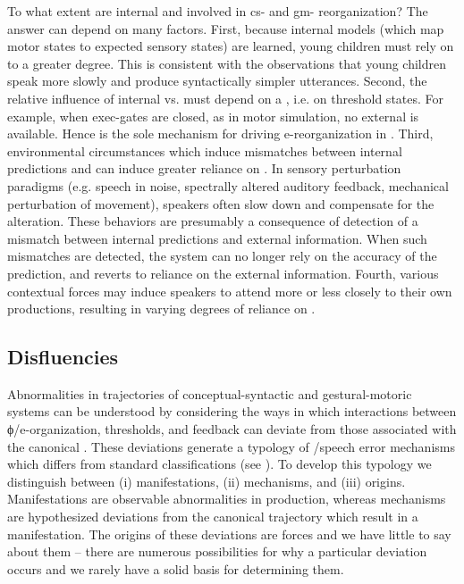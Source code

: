   To what extent are internal and  involved in cs- and gm- reorganization? The answer can depend on many factors. First, because internal models (which map motor states to expected sensory states) are learned, young children must rely on  to a greater degree. This is consistent with the observations that young children speak more slowly and produce syntactically simpler utterances. Second, the relative influence of internal vs.  must depend on a , i.e. on threshold states. For example, when exec-gates are closed, as in motor simulation, no external  is available. Hence  is the sole mechanism for driving e-reorganization in . Third, environmental circumstances which induce mismatches between internal predictions and  can induce greater reliance on . In sensory perturbation paradigms (e.g. speech in noise, spectrally altered auditory feedback, mechanical perturbation of movement), speakers often slow down and compensate for the alteration. These behaviors are presumably a consequence of detection of a mismatch between internal predictions and external information. When such mismatches are detected, the system can no longer rely on the accuracy of the prediction, and reverts to reliance on the external information. Fourth, various contextual forces may induce speakers to attend more or less closely to their own productions, resulting in varying degrees of reliance on .

\subsection{Disfluencies}

Abnormalities in trajectories of conceptual-syntactic and gestural-motoric systems can be understood by considering the ways in which interactions between ϕ/e-organization, thresholds, and feedback can deviate from those associated with the canonical . These deviations generate a typology of /speech error mechanisms which differs from standard classifications (see \citealt{Fromkin1971,Fromkin1984,Shriberg2001}). To develop this typology we distinguish between (i)  manifestations, (ii)  mechanisms, and (iii)  origins. Manifestations are observable abnormalities in production, whereas mechanisms are hypothesized deviations from the canonical trajectory which result in a  manifestation. The origins of these deviations are  forces and we have little to say about them -- there are numerous possibilities for why a particular deviation occurs and we rarely have a solid basis for determining them. 

